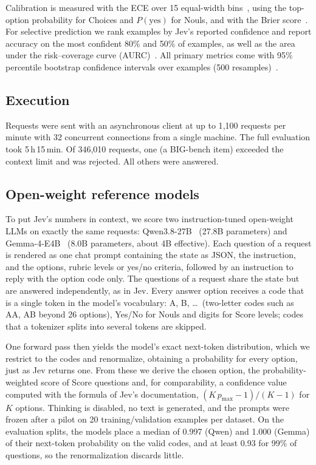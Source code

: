 \documentclass[table]{article}
\begin{document}
Calibration is measured with the ECE over 15 equal-width bins~\cite{naeini2015obtaining}, using the top-option probability for Choices and $P(\text{yes})$ for Nouls, and with the Brier score~\cite{glenn1950verification}. For selective prediction we rank examples by Jev's reported confidence and report accuracy on the most confident 80\% and 50\% of examples, as well as the area under the risk--coverage curve (AURC)~\cite{geifman2017selective}. All primary metrics come with 95\% percentile bootstrap confidence intervals over examples (500 resamples)~\cite{efron1994introduction}.

\subsection{Execution}

Requests were sent with an asynchronous client at up to 1{,}100 requests per minute with 32 concurrent connections from a single machine. The full evaluation took 5\,h\,15\,min. Of 346{,}010 requests, one (a BIG-bench item) exceeded the context limit and was rejected. All others were answered.

\subsection{Open-weight reference models}
\label{sec:open-models}

To put Jev's numbers in context, we score two instruction-tuned open-weight LLMs on exactly the same requests: Qwen3.8-27B~\cite{qwen2026qwen38} (27.8B parameters) and Gemma-4-E4B~\cite{gemmateam2026gemma4technicalreport} (8.0B parameters, about 4B effective). Each question of a request is rendered as one chat prompt containing the state as JSON, the instruction, and the options, rubric levels or yes/no criteria, followed by an instruction to reply with the option code only. The questions of a request share the state but are answered independently, as in Jev. Every answer option receives a code that is a single token in the model's vocabulary: A, B, \ldots\ (two-letter codes such as AA, AB beyond 26 options), Yes/No for Nouls and digits for Score levels; codes that a tokenizer splits into several tokens are skipped. 

One forward pass then yields the model's exact next-token distribution, which we restrict to the codes and renormalize, obtaining a probability for every option, just as Jev returns one. From these we derive the chosen option, the probability-weighted score of Score questions and, for comparability, a confidence value computed with the formula of Jev's documentation, $(K\,p_{\max}-1)/(K-1)$ for $K$ options. Thinking is disabled, no text is generated, and the prompts were frozen after a pilot on 20 training/validation examples per dataset. On the evaluation splits, the models place a median of 0.997 (Qwen) and 1.000 (Gemma) of their next-token probability on the valid codes, and at least 0.93 for 99\% of questions, so the renormalization discards little. 
\end{document}
